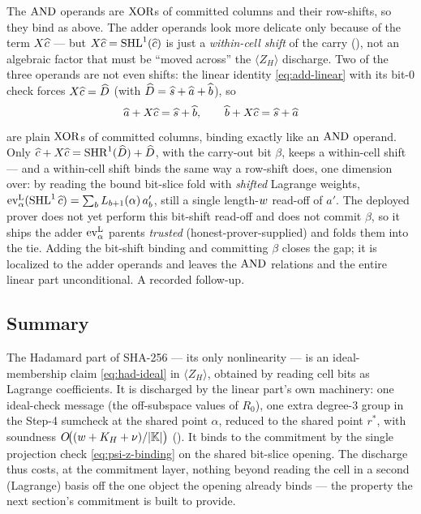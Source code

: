 \begin{remark}
\label{rem:adder-trusted}
The $\operatorname{AND}$ operands are $\operatorname{XOR}$s of committed columns and their row-shifts, so
they bind as above. The adder operands look more delicate only because of the
term $X\widehat{c}$ --- but $X\widehat{c}=\operatorname{SHL}^{1}(\widehat{c})$ is just a \emph{within-cell
shift} of the carry (), not an algebraic factor that must be
``moved across'' the $\langle Z_H\rangle$ discharge. Two of the three operands
are not even shifts: the linear identity \eqref{eq:add-linear} with its bit-$0$
check forces $X\widehat{c}=\widehat{D}$ (with $\widehat{D}=\widehat{s}+\widehat{a}+\widehat{b}$), so
\[
  \widehat{a}+X\widehat{c} = \widehat{s}+\widehat{b},
  \qquad
  \widehat{b}+X\widehat{c} = \widehat{s}+\widehat{a}
\]
are plain $\operatorname{XOR}$s of committed columns, binding exactly like an $\operatorname{AND}$ operand.
Only $\widehat{c}+X\widehat{c} = \operatorname{SHR}^{1}(\widehat{D})+\widehat{D}$, with the carry-out bit
$\beta$, keeps a within-cell shift --- and a within-cell shift binds the same
way a row-shift does, one dimension over: by reading the bound bit-slice fold
with \emph{shifted} Lagrange weights,
$\operatorname{ev}^{\mathrm{L}}_{\alpha}(\operatorname{SHL}^{1}\widehat{c}) = \sum_b L_{b+1}(\alpha)\,a'_b$, still a single
length-$w$ read-off of $a'$. The deployed prover does not yet perform this
bit-shift read-off and does not commit $\beta$, so it ships the adder $\operatorname{ev}^{\mathrm{L}}_{\alpha}$
parents \emph{trusted} (honest-prover-supplied) and folds them into the tie.
Adding the bit-shift binding and committing $\beta$ closes the gap; it is
localized to the adder operands and leaves the $\operatorname{AND}$ relations and the entire
linear part unconditional. A recorded follow-up.
\end{remark}

\subsection{Summary}
\label{sec:had-summary}

The Hadamard part of SHA-256 --- its only nonlinearity --- is an
ideal-membership claim \eqref{eq:had-ideal} in $\langle Z_H\rangle$, obtained
by reading cell bits as Lagrange coefficients. It is discharged by the linear
part's own machinery: one ideal-check message (the off-subspace values of
$R_0$), one extra degree-$3$ group in the Step-4 sumcheck at the shared point
$\alpha$, reduced to the shared point $r^*$, with soundness
$O\!\bigl((w + K_H + \nu)/|\mathbb{K}|\bigr)$ (). It binds to
the commitment by the single projection check \eqref{eq:psi-z-binding} on the
shared bit-slice opening. The discharge thus costs, at the commitment layer,
nothing beyond reading the cell in a second (Lagrange) basis off the one object the opening
already binds --- the property the next section's commitment is built to
provide.
